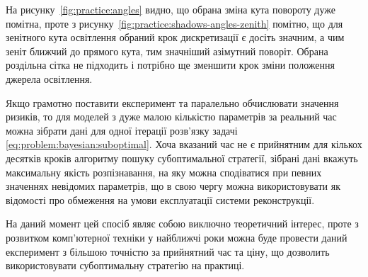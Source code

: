 На рисунку~\ref{fig:practice:angles} видно,
що обрана зміна кута повороту дуже помітна,
проте з рисунку~\ref{fig:practice:shadows-angles-zenith} помітно,
що для зенітного кута освітлення
обраний крок дискретизації є досіть значним,
а чим зеніт ближчий до прямого кута,
тим значніший азімутний поворіт.
Обрана роздільна сітка не підходить
і потрібно ще зменшити крок зміни положення джерела освітлення.

Якщо грамотно поставити експеримент та паралельно обчислювати значення ризиків,
то для моделей з дуже малою кількістю параметрів за реальний час можна зібрати дані
для одної ітерації розв'язку задачі \eqref{eq:problem:bayesian:suboptimal}.
Хоча вказаний час не є прийнятним для кількох десятків кроків
алгоритму пошуку субоптимальної стратегії,
зібрані дані вкажуть максимальну якість розпізнавання,
на яку можна сподіватися при певних значеннях невідомих параметрів,
що в свою чергу можна використовувати як
відомості про обмеження на умови експлуатації системи реконструкції.

На даний момент цей спосіб являє собою виключно теоретичний інтерес,
проте з розвитком комп'ютерної техніки у найближчі роки можна буде
провести даний експеримент з більшою точністю за прийнятний час та ціну,
що дозволить використовувати субоптимальну стратегію на практиці.
